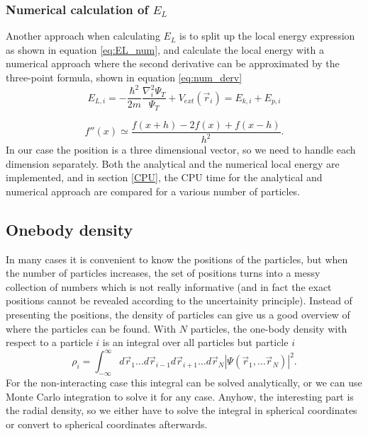 \documentclass[norsk,a4paper,12pt]{article}
\begin{document}
\subsubsection{Numerical calculation of $E_L$} \label{Numerical_calc_E_L}

Another approach when calculating $E_L$ is to split up the local energy expression as shown in equation \ref{eq:EL_num}, and calculate the local energy with a numerical approach where the second derivative can be approximated by the three-point formula, shown in equation \ref{eq:num_derv}
\begin{equation}
\label{eq:EL_num}
E_{L,i}=-\frac{\hbar^2}{2m}\frac{\nabla_i^2\Psi_T}{\Psi_T}+V_{ext}(\vec{r}_i)=E_{k,i}+E_{p,i}
\end{equation}

\begin{equation}
\label{eq:num_derv}
f''(x)\simeq\frac{f(x+h)-2f(x)+f(x-h)}{h^2}.
\end{equation}
In our case the position is a three dimensional vector, so we need to handle each dimension separately. Both the analytical and the numerical local energy are implemented, and in section \ref{CPU}, the CPU time for the analytical and numerical approach are compared for a various number of particles. 


\subsection{Onebody density} \label{sec:OB_theory}
In many cases it is convenient to know the positions of the particles, but when the number of particles increases, the set of positions turns into a messy collection of numbers which is not really informative (and in fact the exact positions cannot be revealed according to the uncertainity principle). Instead of presenting the positions, the density of particles can give us a good overview of where the particles can be found. With $N$ particles, the one-body density with respect to a particle $i$ is an integral over all particles but particle $i$
\begin{equation}
\rho_i=\int_{-\infty}^{\infty}d\vec{r}_1\hdots d\vec{r}_{i-1}d\vec{r}_{i+1}\hdots d\vec{r}_N |\Psi(\vec{r}_1,\hdots \vec{r}_N)|^2.
\end{equation}
For the non-interacting case this integral can be solved analytically, or we can use Monte Carlo integration to solve it for any case. Anyhow, the interesting part is the radial density, so we either have to solve the integral in spherical coordinates or convert to spherical coordinates afterwards. 
\end{document}
